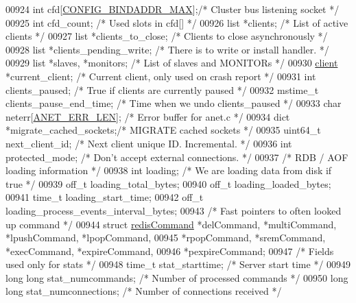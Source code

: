 \begin{DoxyCode}
{{{{{{00924     \textcolor{keywordtype}{int} cfd[\hyperlink{server_8h_a314d02fcabccac3e59ecaa9d34f0d597}{CONFIG\_BINDADDR\_MAX}];\textcolor{comment}{/* Cluster bus listening socket */}
00925     \textcolor{keywordtype}{int} cfd\_count;              \textcolor{comment}{/* Used slots in cfd[] */}
00926     list *clients;              \textcolor{comment}{/* List of active clients */}
00927     list *clients\_to\_close;     \textcolor{comment}{/* Clients to close asynchronously */}
00928     list *clients\_pending\_write; \textcolor{comment}{/* There is to write or install handler. */}
00929     list *slaves, *monitors;    \textcolor{comment}{/* List of slaves and MONITORs */}
00930     \hyperlink{structclient}{client} *current\_client; \textcolor{comment}{/* Current client, only used on crash report */}
00931     \textcolor{keywordtype}{int} clients\_paused;         \textcolor{comment}{/* True if clients are currently paused */}
00932     mstime\_t clients\_pause\_end\_time; \textcolor{comment}{/* Time when we undo clients\_paused */}
00933     \textcolor{keywordtype}{char} neterr[\hyperlink{anet_8h_a92d565f421c133e9fac9dbbe8c88922b}{ANET\_ERR\_LEN}];   \textcolor{comment}{/* Error buffer for anet.c */}
00934     dict *migrate\_cached\_sockets;\textcolor{comment}{/* MIGRATE cached sockets */}
00935     uint64\_t next\_client\_id;    \textcolor{comment}{/* Next client unique ID. Incremental. */}
00936     \textcolor{keywordtype}{int} protected\_mode;         \textcolor{comment}{/* Don't accept external connections. */}
00937     \textcolor{comment}{/* RDB / AOF loading information */}
00938     \textcolor{keywordtype}{int} loading;                \textcolor{comment}{/* We are loading data from disk if true */}
00939     off\_t loading\_total\_bytes;
00940     off\_t loading\_loaded\_bytes;
00941     time\_t loading\_start\_time;
00942     off\_t loading\_process\_events\_interval\_bytes;
00943     \textcolor{comment}{/* Fast pointers to often looked up command */}
00944     \textcolor{keyword}{struct} \hyperlink{structredisCommand}{redisCommand} *delCommand, *multiCommand, *lpushCommand, *lpopCommand,
00945                         *rpopCommand, *sremCommand, *execCommand, *expireCommand,
00946                         *pexpireCommand;
00947     \textcolor{comment}{/* Fields used only for stats */}
00948     time\_t stat\_starttime;          \textcolor{comment}{/* Server start time */}
00949     \textcolor{keywordtype}{long} \textcolor{keywordtype}{long} stat\_numcommands;     \textcolor{comment}{/* Number of processed commands */}
00950     \textcolor{keywordtype}{long} \textcolor{keywordtype}{long} stat\_numconnections;  \textcolor{comment}{/* Number of connections received */}
}}}}}}
\end{DoxyCode}
